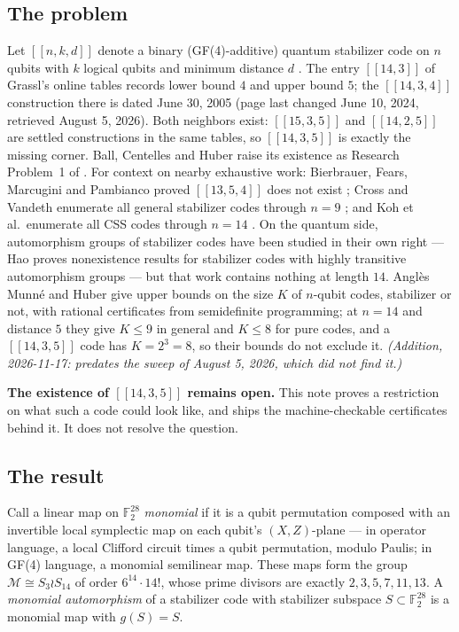 \documentclass[11pt]{amsart}
\newcommand{\FF}{\mathbb{F}_{2}}
\newcommand{\code}[3]{[[#1,#2,#3]]}
\newcommand{\Mon}{\mathcal{M}}
\theoremstyle{plain}
\theoremstyle{definition}
\theoremstyle{remark}
\begin{document}
\subsection{The problem}
Let $\code{n}{k}{d}$ denote a binary (GF(4)-additive) quantum stabilizer
code on $n$ qubits with $k$ logical qubits and minimum distance $d$
\cite{Gottesman97,CRSS}. The entry $[[14,3]]$ of Grassl's online tables
\cite{Grassl} records lower bound $4$ and upper bound $5$; the
$\code{14}{3}{4}$ construction there is dated June 30, 2005 (page last
changed June 10, 2024, retrieved August 5, 2026). Both neighbors exist: $\code{15}{3}{5}$ and $\code{14}{2}{5}$ are
settled constructions in the same tables, so $\code{14}{3}{5}$ is exactly
the missing corner. Ball, Centelles and Huber raise its existence as
Research Problem~1 of \cite{BCH}. For context on nearby exhaustive work:
Bierbrauer, Fears, Marcugini and Pambianco proved $\code{13}{5}{4}$ does
not exist \cite{BFMP}; Cross and Vandeth
enumerate all general stabilizer codes through $n=9$ \cite{CrossVandeth};
and Koh et al.\ enumerate all CSS codes through $n=14$ \cite{Koh26}. On
the quantum side, automorphism groups of stabilizer codes have been
studied in their own right --- Hao \cite{Hao21} proves nonexistence
results for stabilizer codes with highly transitive automorphism groups
--- but that work contains nothing at length $14$. Angl\`es Munn\'e and Huber
\cite{MH26} give upper bounds on the size $K$ of $n$-qubit codes,
stabilizer or not, with rational certificates from semidefinite
programming; at $n=14$ and distance $5$ they give $K\le 9$ in general and
$K\le 8$ for pure codes, and a $\code{14}{3}{5}$ code has $K=2^3=8$, so
their bounds do not exclude it. \emph{(Addition, 2026-11-17: \cite{MH26}
predates the sweep of August 5, 2026, which did not find it.)}

\textbf{The existence of $\code{14}{3}{5}$ remains open.} This note proves
a restriction on what such a code could look like, and ships the
machine-checkable certificates behind it. It does not resolve the
question.

\subsection{The result}
Call a linear map on $\FF^{28}$ \emph{monomial} if it is a qubit
permutation composed with an invertible local symplectic map on each
qubit's $(X,Z)$-plane --- in operator language, a local Clifford circuit
times a qubit permutation, modulo Paulis; in GF(4) language, a monomial
semilinear map. These maps form the group
$\Mon \cong S_{3}\wr S_{14}$ of order $6^{14}\cdot 14!$, whose prime
divisors are exactly $2,3,5,7,11,13$. A \emph{monomial automorphism} of a
stabilizer code with stabilizer subspace $S\subset\FF^{28}$ is a monomial
map with $g(S)=S$.
\end{document}
